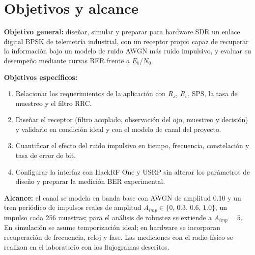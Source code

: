 \section{Objetivos y alcance}
\label{sec:objetivos}

\textbf{Objetivo general:} diseñar, simular y preparar para hardware SDR un enlace digital BPSK de telemetría industrial, con un receptor propio capaz de recuperar la información bajo un modelo de ruido AWGN más ruido impulsivo, y evaluar su desempeño mediante curvas BER frente a $E_b/N_0$.
    
\textbf{Objetivos específicos:}
\begin{enumerate}
    \item Relacionar los requerimientos de la aplicación con $R_s$, $R_b$, SPS, la tasa de muestreo y el filtro RRC.
    \item Diseñar el receptor (filtro acoplado, observación del ojo, muestreo y decisión) y validarlo en condición ideal y con el modelo de canal del proyecto.
    \item Cuantificar el efecto del ruido impulsivo en tiempo, frecuencia, constelación y tasa de error de bit.
    \item Configurar la interfaz con HackRF One y USRP sin alterar los parámetros de diseño y preparar la medición BER experimental.
\end{enumerate}

\textbf{Alcance:} el canal se modela en banda base con AWGN de amplitud 0.10 y un tren periódico de impulsos reales de amplitud $A_{imp}\in\{0,\,0.3,\,0.6,\,1.0\}$, un impulso cada 256 muestras; para el análisis de robustez se extiende a $A_{imp}=5$. En simulación se asume temporización ideal; en hardware se incorporan recuperación de frecuencia, reloj y fase. Las mediciones con el radio físico se realizan en el laboratorio con los flujogramas descritos.
